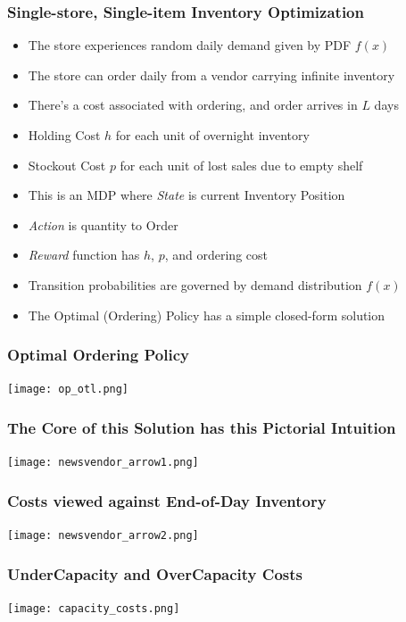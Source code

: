\documentclass[handout]{beamer}
\begin{document}
\begin{frame}
\frametitle{Single-store, Single-item Inventory Optimization}
\pause
\begin{itemize}[<+->]
\item The store experiences random daily demand given by PDF $f(x)$
\item The store can order daily from a vendor carrying infinite inventory
\item There's a cost associated with ordering, and order arrives in $L$ days
\item Holding Cost $h$ for each unit of overnight inventory
\item Stockout Cost $p$ for each unit of lost sales due to empty shelf
\item This is an MDP where {\em State} is current Inventory Position
\item {\em Action} is quantity to Order
\item {\em Reward} function has $h$, $p$, and ordering cost
\item Transition probabilities are governed by demand distribution $f(x)$
\item The Optimal (Ordering) Policy has a simple closed-form solution
\end{itemize}
\end{frame}

\begin{frame}
\frametitle{Optimal Ordering Policy}
\texttt{[image: op\_otl.png]}
\end{frame}


\begin{frame}
\frametitle{The Core of this Solution has this Pictorial Intuition}
\texttt{[image: newsvendor\_arrow1.png]}
\end{frame}


\begin{frame}
\frametitle{Costs viewed against End-of-Day Inventory}
\texttt{[image: newsvendor\_arrow2.png]}
\end{frame}

\begin{frame}
\frametitle{UnderCapacity and OverCapacity Costs}
\texttt{[image: capacity\_costs.png]}
\end{frame}
\end{document}
